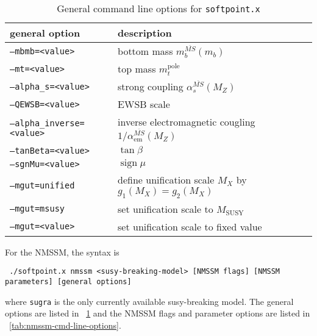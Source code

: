 \documentclass[final,3p,times,pdflatex]{elsarticle}
\def\code#1{\small{\tt #1}\normalsize}
\newcommand{\MSbar}{{\overline{MS}}}
\DeclareMathOperator{\sign}{sign}
\begin{document}
\begin{table}[tbh]
  \centering
  \begin{tabular}{ll}
    general option & description \\
    \hline
    \code{--mbmb=<value>} & bottom mass $m_b^\MSbar(m_b)$ \\
    \code{--mt=<value>} & top mass $m_t^\text{pole}$ \\
    \code{--alpha\_s=<value>} & strong coupling $\alpha_s^\MSbar(M_Z)$ \\
    \code{--QEWSB=<value>} & EWSB scale \\
    \code{--alpha\_inverse=<value>} & inverse electromagnetic cougling $1/\alpha^\MSbar_\text{em}(M_Z)$ \\
    \code{--tanBeta=<value>} & $\tan\beta$ \\
    \code{--sgnMu=<value>} & $\sign\mu$ \\
    \code{--mgut=unified} & define unification scale $M_X$ by $g_1(M_X)=g_2(M_X)$ \\
    \code{--mgut=msusy} & set unification scale to $M_\text{SUSY}$ \\
    \code{--mgut=<value>} & set unification scale to fixed value \\
    \hline
  \end{tabular}
  \caption{General command line options for \code{softpoint.x}}
  \label{tab:general-cmd-line-options}
\end{table}
%
For the NMSSM, the syntax is
%
\small
\begin{verbatim}
 ./softpoint.x nmssm <susy-breaking-model> [NMSSM flags] [NMSSM parameters] [general options]
\end{verbatim}
\normalsize
%
where \code{sugra} is the only currently available susy-breaking
model.  The general options are listed in
\tablename~\ref{tab:general-cmd-line-options} and the NMSSM flags and
parameter options are listed in
\tablename~\ref{tab:nmssm-cmd-line-options}.
%
\end{document}

